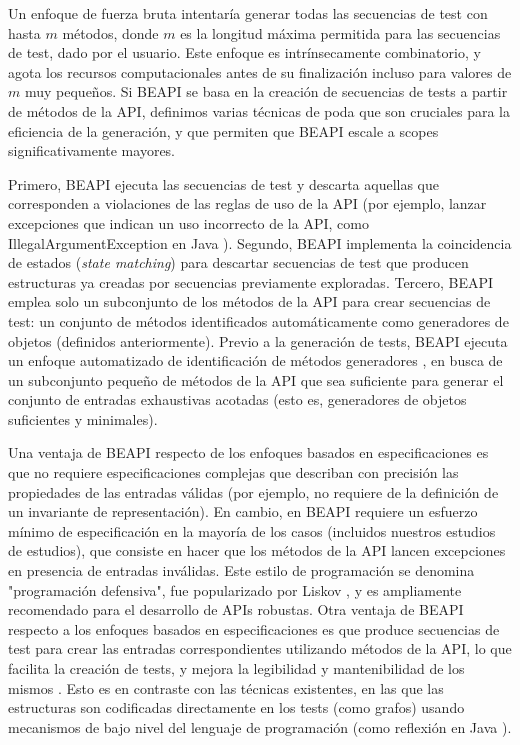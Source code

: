 Un enfoque de fuerza bruta intentaría generar todas las secuencias de test con
hasta $m$ métodos, donde $m$ es la longitud máxima permitida para las secuencias de test, 
dado por el usuario. Este enfoque es intrínsecamente combinatorio, y agota los recursos 
computacionales antes de su finalización incluso para valores de $m$ muy pequeños. 
Si BEAPI se basa en la creación de secuencias de tests a partir de métodos de la
API, definimos varias técnicas de poda que son cruciales para la eficiencia de
la generación, y que permiten que BEAPI escale a scopes significativamente mayores. 

Primero, BEAPI ejecuta las secuencias de test y descarta aquellas que corresponden 
a violaciones de las reglas de uso de la API \cite{Pacheco07} (por ejemplo, lanzar 
excepciones que indican un uso incorrecto de la API, como IllegalArgumentException en 
Java \cite{Liskov00, Pacheco07}). 
Segundo, BEAPI implementa la coincidencia de estados (\emph{state matching})
\cite{Iosif02, Politano20, Xie04} para descartar secuencias de test que
producen estructuras ya creadas por secuencias previamente exploradas. 
Tercero, BEAPI emplea solo un subconjunto de los métodos de la API para crear
secuencias de test: un conjunto de métodos identificados automáticamente como
generadores de objetos \cite{Ponzio19} (definidos anteriormente). 
Previo a la generación de tests, BEAPI ejecuta un enfoque automatizado de
identificación de métodos generadores \cite{Ponzio19}, en busca de un
subconjunto pequeño de métodos de la API que sea suficiente para generar el conjunto 
de entradas exhaustivas acotadas (esto es, generadores de objetos suficientes y
minimales). 

Una ventaja de BEAPI respecto de los enfoques basados en especificaciones es que
no requiere especificaciones complejas que describan con precisión las
propiedades de las entradas válidas (por ejemplo, no requiere de la definición
de un invariante de representación). En cambio, en BEAPI 
requiere un esfuerzo mínimo de especificación en la mayoría de los casos (incluidos nuestros estudios de estudios), que consiste en 
hacer que los métodos de la API lancen excepciones en presencia de entradas
inválidas. Este estilo de programación se denomina "programación defensiva", 
fue popularizado por Liskov \cite{Liskov00}, y es ampliamente recomendado para el desarrollo de APIs robustas. 
Otra ventaja de BEAPI respecto a los enfoques basados en especificaciones es que produce secuencias de test para crear las entradas correspondientes utilizando métodos de la API, lo que facilita la creación de tests, y mejora la legibilidad y mantenibilidad de los mismos \cite{Braione17}. Esto es en contraste con las técnicas existentes, en las que las estructuras son codificadas directamente en los tests (como grafos) usando mecanismos de bajo nivel del lenguaje de programación (como reflexión en Java \cite{} ).


